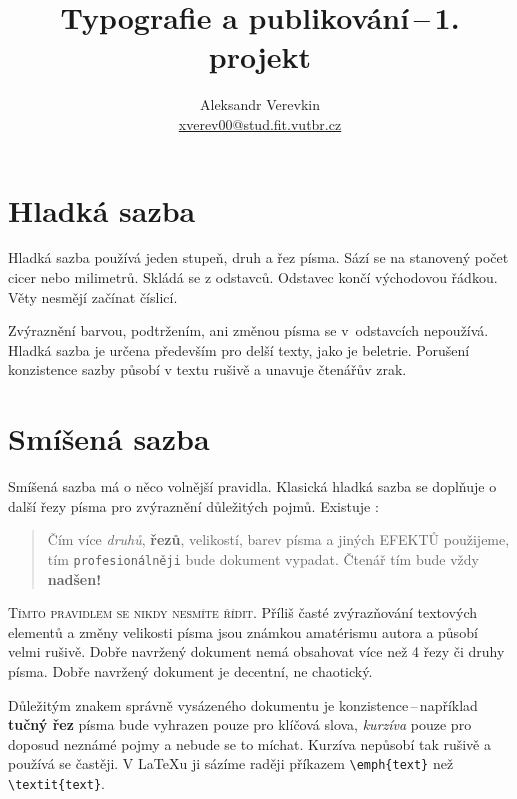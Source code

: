 \documentclass[a4paper, 10pt, twocolumn, final]{article}
\title{Typografie a publikování\,--\,1. projekt}
\author{Aleksandr Verevkin \\ \href{mailto:xverev00@stud.fit.vutbr.cz}{xverev00@stud.fit.vutbr.cz}}
\date{}
\begin{document}
\maketitle

\section{Hladká sazba}

Hladká sazba používá jeden stupeň, druh a řez písma.
Sází se na stanovený počet cicer nebo milimetrů.
Skládá se z odstavců. Odstavec končí východovou řádkou.
Věty nesmějí začínat číslicí.

Zvýraznění barvou, podtržením, ani změnou písma se
\mbox{v odstavcích} nepoužívá. Hladká sazba je určena především      %
pro delší texty, jako je beletrie. Porušení konzistence sazby
působí v textu rušivě a unavuje čtenářův zrak.

\section{Smíšená sazba}

Smíšená sazba má o něco volnější pravidla.
Klasická hladká sazba se doplňuje o další řezy písma pro zvýraznění důležitých pojmů.
Existuje :

\begin{quotation}
Čím více \textit{druhů}, \textbf{řezů}, {\tiny velikostí}, {\color{red} barev} písma a jiných {\footnotesize EFEKTŮ} použijeme, tím \verb|profesionálněji| bude {\Large {}\selectfont dokument} vypadat.
{\huge Č}{\LARGE t}{\Large e}{\large n}á{\small ř} {\footnotesize t}{\scriptsize í}{\tiny m} bude vždy \textbf{\Huge nadšen!}
\end{quotation}

\textsc{Tímto pravidlem se nikdy nesmíte řídit}.
Příliš časté zvýrazňování textových elementů a změny velikosti písma jsou známkou amatérismu autora a působí velmi rušivě.
Dobře navržený dokument nemá obsahovat více než 4 řezy či druhy písma.
Dobře navržený dokument je decentní, ne chaotický.

Důležitým znakem správně vysázeného dokumentu je konzistence\,--\,například \textbf{tučný řez} písma bude vyhrazen pouze pro klíčová slova, \textit{kurzíva} pouze pro doposud neznámé pojmy a nebude se to míchat.
Kurzíva nepůsobí tak rušivě a používá se častěji.
V \LaTeX u ji sázíme raději příkazem \verb|\emph{text}| než \verb|\textit{text}|.
\end{document}
